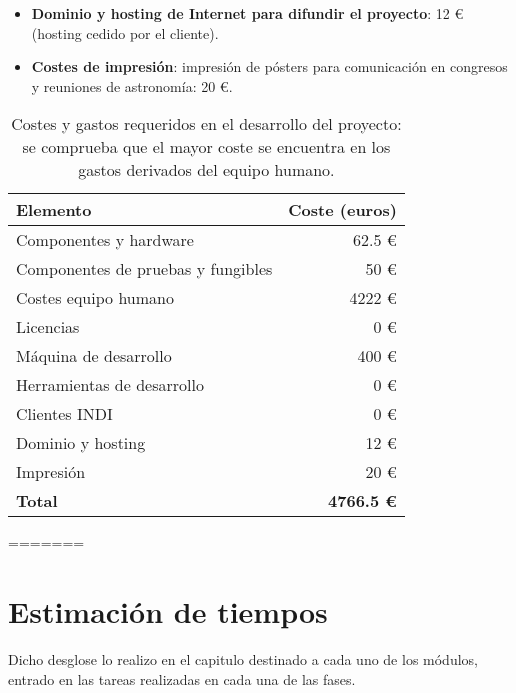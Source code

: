 \begin{itemize}
\begin{itemize}
\begin{itemize}
\begin{itemize}
	\item \textbf{Dominio y hosting de Internet para difundir el proyecto}: 12  \euro ~ (hosting cedido por el cliente).
	
	\item \textbf{Costes de impresión}: impresión de pósters para comunicación en congresos y reuniones de astronomía: 20 \euro.
\end{itemize}

\begin{table}[h!]
	\centering
	
	\begin{tabular}{|l|r|}
		\hline
		\textbf{Elemento}                  				& \textbf{Coste (euros)} 			\\ \hline\hline
		Componentes y hardware                   &                      	62.5 \euro  \\ \hline
		Componentes de pruebas y fungibles   &                      	50 \euro  \\ \hline
		Costes  equipo humano         			&                      4222 \euro  \\ \hline
		Licencias 					        &                      	0   \euro  \\ \hline
		Máquina de desarrollo 				&                      400 	 \euro  \\ \hline
		Herramientas de desarrollo   		&                      0 	 \euro  \\ \hline
		Clientes INDI        		&                      0     \euro  \\ \hline
		Dominio y hosting		&			12 \euro \\ \hline
		Impresión			&			20 \euro \\ \hline\hline
		
		\textbf{Total}          	&            \textbf{4766.5 \euro} \\ \hline
	\end{tabular} 

	\caption{Costes y gastos requeridos en el desarrollo del proyecto: se comprueba que el mayor coste se encuentra en los gastos derivados del equipo humano.}
		\label{tabla_costes}
\end{table}

=======

\section{Estimación de tiempos}

Dicho desglose lo realizo en el capitulo destinado a cada uno de los módulos, entrado en las tareas realizadas en cada una de las fases.



\end{itemize}
\end{itemize}
\end{itemize}
